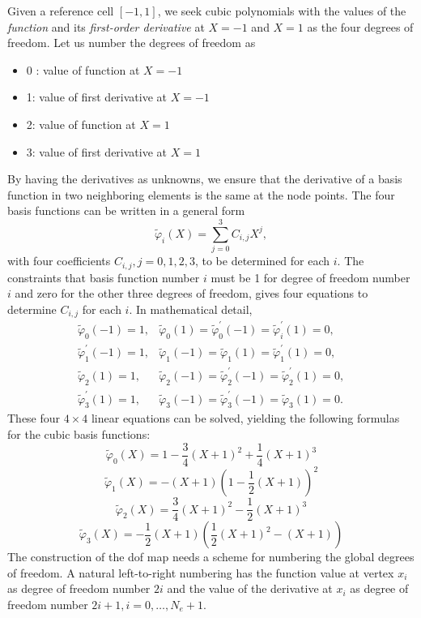 \documentclass[../main.tex]{subfiles}
\begin{document}
Given a reference cell $[-1,1]$, we seek cubic polynomials with the values of the \textit{function} and its \textit{first-order derivative} at $X=-1$ and $X=1$ as the four degrees of freedom. Let us number the degrees of freedom as
\begin{itemize}
	\item 0 : value of function at $X=-1$
	\item 1: value of first derivative at $X=-1$
	\item 2: value of function at $X=1$
	\item 3: value of first derivative at $X=1$
\end{itemize}
By having the derivatives as unknowns, we ensure that the derivative of a basis function in two neighboring elements is the same at the node points.
The four basis functions can be written in a general form
$$
\tilde{\varphi}_{i}(X)=\sum_{j=0}^{3} C_{i, j} X^{j},
$$
with four coefficients $C_{i, j}, j=0,1,2,3$, to be determined for each $i$. The constraints that basis function number $i$ must be 1 for degree of freedom number $i$ and zero for the other three degrees of freedom, gives four equations to determine $C_{i, j}$ for each $i$. In mathematical detail,
$$
\begin{aligned}
	\tilde{\varphi}_{0}(-1)=1, & \tilde{\varphi}_{0}(1)=\tilde{\varphi}_{0}^{\prime}(-1)=\tilde{\varphi}_{i}^{\prime}(1)=0, \\
	\tilde{\varphi}_{1}^{\prime}(-1)=1, & \tilde{\varphi}_{1}(-1)=\tilde{\varphi}_{1}(1)=\tilde{\varphi}_{1}^{\prime}(1)=0, \\
	\tilde{\varphi}_{2}(1)=1, & \tilde{\varphi}_{2}(-1)=\tilde{\varphi}_{2}^{\prime}(-1)=\tilde{\varphi}_{2}^{\prime}(1)=0, \\
	\tilde{\varphi}_{3}^{\prime}(1)=1, & \tilde{\varphi}_{3}(-1)=\tilde{\varphi}_{3}^{\prime}(-1)=\tilde{\varphi}_{3}(1)=0 .
\end{aligned}
$$
These four $4 \times 4$ linear equations can be solved, yielding the following formulas for the cubic basis functions:
\begin{equation}\label{eqa94}
	\tilde{\varphi}_{0}(X) =1-\frac{3}{4}(X+1)^{2}+\frac{1}{4}(X+1)^{3}
\end{equation}
\begin{equation}\label{eqa95}
	\tilde{\varphi}_{1}(X) =-(X+1)\left(1-\frac{1}{2}(X+1)\right)^{2}
\end{equation}
\begin{equation}\label{eqa96}
	\tilde{\varphi}_{2}(X) =\frac{3}{4}(X+1)^{2}-\frac{1}{2}(X+1)^{3}
\end{equation}
\begin{equation}\label{eqa97}
	\tilde{\varphi}_{3}(X) =-\frac{1}{2}(X+1)\left(\frac{1}{2}(X+1)^{2}-(X+1)\right)
\end{equation}
\begin{equation}\label{eqa98}
\end{equation}	
The construction of the dof map needs a scheme for numbering the global degrees of freedom. A natural left-to-right numbering has the function value at vertex $x_{i}$ as degree of freedom number $2 i$ and the value of the derivative at $x_{i}$ as degree of freedom number $2 i+1, i=0, \ldots, N_{e}+1$.
\end{document}
